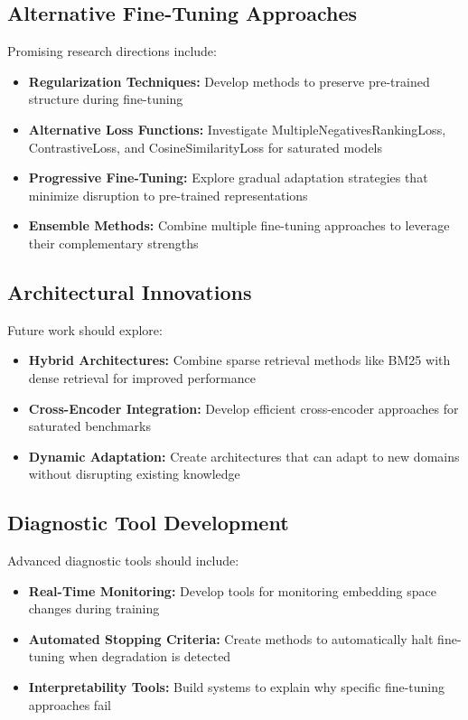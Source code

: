 \subsection{Alternative Fine-Tuning Approaches}

Promising research directions include:

\begin{itemize}
\item \textbf{Regularization Techniques:} Develop methods to preserve pre-trained structure during fine-tuning
\item \textbf{Alternative Loss Functions:} Investigate MultipleNegativesRankingLoss, ContrastiveLoss, and CosineSimilarityLoss for saturated models
\item \textbf{Progressive Fine-Tuning:} Explore gradual adaptation strategies that minimize disruption to pre-trained representations
\item \textbf{Ensemble Methods:} Combine multiple fine-tuning approaches to leverage their complementary strengths
\end{itemize}

\subsection{Architectural Innovations}

Future work should explore:

\begin{itemize}
\item \textbf{Hybrid Architectures:} Combine sparse retrieval methods like BM25 with dense retrieval for improved performance
\item \textbf{Cross-Encoder Integration:} Develop efficient cross-encoder approaches for saturated benchmarks
\item \textbf{Dynamic Adaptation:} Create architectures that can adapt to new domains without disrupting existing knowledge
\end{itemize}

\subsection{Diagnostic Tool Development}

Advanced diagnostic tools should include:

\begin{itemize}
\item \textbf{Real-Time Monitoring:} Develop tools for monitoring embedding space changes during training
\item \textbf{Automated Stopping Criteria:} Create methods to automatically halt fine-tuning when degradation is detected
\item \textbf{Interpretability Tools:} Build systems to explain why specific fine-tuning approaches fail
\end{itemize}

